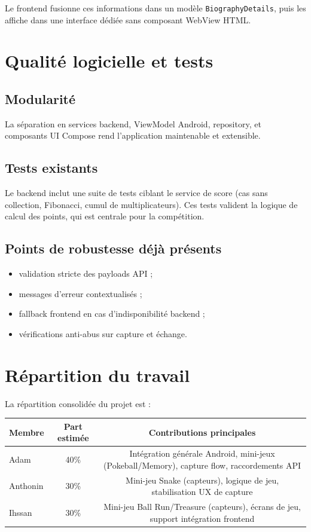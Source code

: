 \documentclass[11pt,a4paper]{article}
\begin{document}
Le frontend fusionne ces informations dans un modèle \texttt{BiographyDetails}, puis les affiche dans une interface dédiée sans composant WebView HTML.

\section{Qualité logicielle et tests}
\subsection{Modularité}
La séparation en services backend, ViewModel Android, repository, et composants UI Compose rend l'application maintenable et extensible.

\subsection{Tests existants}
Le backend inclut une suite de tests ciblant le service de score (cas sans collection, Fibonacci, cumul de multiplicateurs). Ces tests valident la logique de calcul des points, qui est centrale pour la compétition.

\subsection{Points de robustesse déjà présents}
\begin{itemize}[leftmargin=1.2cm]
  \item validation stricte des payloads API ;
  \item messages d'erreur contextualisés ;
  \item fallback frontend en cas d'indisponibilité backend ;
  \item vérifications anti-abus sur capture et échange.
\end{itemize}

\section{Répartition du travail}
La répartition consolidée du projet est :
\begin{center}
\begin{tabular}{lcc}
\toprule
\textbf{Membre} & \textbf{Part estimée} & \textbf{Contributions principales} \\
\midrule
Adam & 40\% & Intégration générale Android, mini-jeux (Pokeball/Memory), capture flow, raccordements API \\
Anthonin & 30\% & Mini-jeu Snake (capteurs), logique de jeu, stabilisation UX de capture \\
Ihssan & 30\% & Mini-jeu Ball Run/Treasure (capteurs), écrans de jeu, support intégration frontend \\
\bottomrule
\end{tabular}
\end{center}
\end{document}
